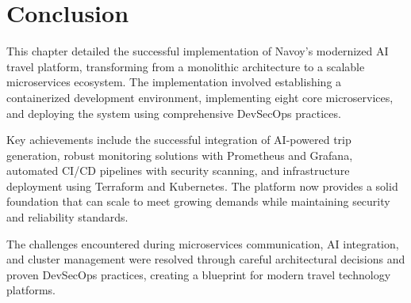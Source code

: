 \setcounter{secnumdepth}{0} %
\section{Conclusion}
This chapter detailed the successful implementation of Navoy's modernized AI travel platform, transforming from a monolithic architecture to a scalable microservices ecosystem. The implementation involved establishing a containerized development environment, implementing eight core microservices, and deploying the system using comprehensive DevSecOps practices.

Key achievements include the successful integration of AI-powered trip generation, robust monitoring solutions with Prometheus and Grafana, automated CI/CD pipelines with security scanning, and infrastructure deployment using Terraform and Kubernetes. The platform now provides a solid foundation that can scale to meet growing demands while maintaining security and reliability standards.

The challenges encountered during microservices communication, AI integration, and cluster management were resolved through careful architectural decisions and proven DevSecOps practices, creating a blueprint for modern travel technology platforms.
